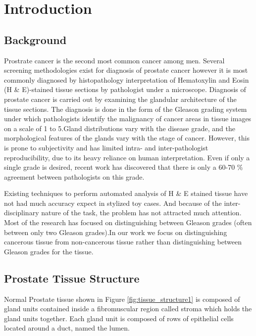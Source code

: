 \section{Introduction}
\label{sec:introduction}

\subsection{Background}
Prostrate cancer is the second most common cancer
among men. Several screening methodologies exist for diagnosis of prostate cancer however it is most commonly diagnosed by histopathology interpretation of Hematoxylin and Eosin (H \& E)-stained tissue sections by pathologist under a microscope. Diagnosis of prostate cancer is carried out by examining the glandular architecture of the tissue sections. The diagnosis is done in the form of the Gleason grading system \cite{gleason1966classification} under which pathologists identify the malignancy of cancer areas in tissue images on a scale of 1 to 5.Gland distributions vary with the disease grade, and the morphological features of the glands vary with the stage of cancer. However, this is prone to subjectivity and has limited intra- and inter-pathologist reproducibility, due to its heavy reliance on human interpretation. Even if only a single grade is desired, recent work has discovered that there is only a 60-70 \% agreement between pathologists on this grade.


Existing techniques to perform automated analysis of H \& E stained tissue have not had much accuracy expect in stylized toy cases. And because of the inter-disciplinary nature of the task, the problem has not attracted much attention. Most of the research has focused on distinguishing between Gleason grades (often between only two Gleason grades).In our work we focus on distinguishing cancerous tissue from non-cancerous tissue rather than distinguishing between Gleason grades for the tissue.

\subsection{Prostate Tissue Structure}
Normal Prostate tissue shown in Figure \ref{fig:tissue_structure1} is composed of gland units contained inside a fibromuscular region called stroma which holds the gland units together. Each gland unit is composed of rows of epithelial cells located around a duct, named the lumen. 

